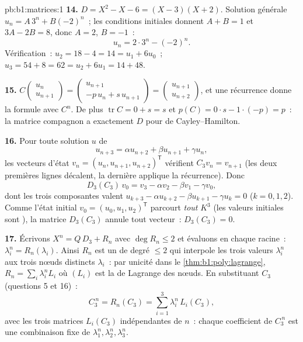\begin{solution}{pb:b1:matrices:1}
\textbf{14.} $D = X^2 - X - 6 = (X - 3)(X + 2)$. Solution générale
$u_n = A\,3^n + B(-2)^n$~; les conditions initiales donnent
$A + B = 1$ et $3A - 2B = 8$, donc $A = 2$, $B = -1$~:
\[
u_n = 2\cdot 3^n - (-2)^n .
\]
Vérification~: $u_2 = 18 - 4 = 14 = u_1 + 6u_0$~; $u_3 = 54 + 8 = 62 =
u_2 + 6u_1 = 14 + 48$.

\textbf{15.} $C\begin{pmatrix} u_n\\ u_{n+1}\end{pmatrix} =
\begin{pmatrix} u_{n+1}\\ -p\,u_n + s\,u_{n+1}\end{pmatrix} =
\begin{pmatrix} u_{n+1}\\ u_{n+2}\end{pmatrix}$, et une récurrence
donne la formule avec $C^n$. De plus $\operatorname{tr} C = 0
+ s = s$ et $p(C) = 0\cdot s - 1\cdot(-p) = p$~: la matrice
compagnon a exactement $D$ pour  de Cayley--Hamilton.

\textbf{16.} Pour toute solution $u$ de
\[
u_{n+3} = \alpha u_{n+2} + \beta u_{n+1} + \gamma u_n ,
\]
les vecteurs d'état $v_n = (u_n,
u_{n+1}, u_{n+2})^{\mathsf T}$ vérifient $C_3 v_n = v_{n+1}$
(les deux premières lignes décalent, la dernière applique la
récurrence). Donc
\[
D_3(C_3)\,v_0 = v_3 - \alpha v_2 - \beta v_1 - \gamma v_0 ,
\]
dont les trois composantes valent $u_{k+3} - \alpha u_{k+2} - \beta
u_{k+1} - \gamma u_k = 0$ ($k = 0, 1, 2$). Comme l'état initial
$v_0 = (u_0, u_1, u_2)^{\mathsf T}$ parcourt \emph{tout}
$K^3$ (les valeurs initiales sont ), la matrice $D_3(C_3)$ annule
tout vecteur~: $D_3(C_3) = 0$.

\textbf{17.} Écrivons $X^n = Q\,D_3 + R_n$ avec $\deg R_n \leq 2$
et évaluons en chaque racine~: $\lambda_i^n = R_n(\lambda_i)$. Ainsi
$R_n$ est un  de degré $\leq 2$ qui interpole les trois
valeurs $\lambda_i^n$ aux trois nœuds distincts $\lambda_i$~: par
unicité dans le \cref{thm:b1:poly:lagrange}, $R_n = \sum_i
\lambda_i^n L_i$ où $(L_i)$ est la  de Lagrange des nœuds.
En substituant $C_3$ (questions 5 et 16)~:
\[
C_3^{\,n} = R_n(C_3) = \sum_{i=1}^{3} \lambda_i^n\,L_i(C_3),
\]
avec les trois matrices $L_i(C_3)$ indépendantes de $n$~: chaque
coefficient de $C_3^{\,n}$ est une combinaison fixe de $\lambda_1^n,
\lambda_2^n, \lambda_3^n$.


\end{solution}
